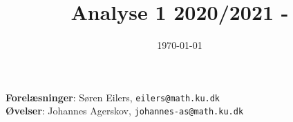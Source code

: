 \documentclass{article}
\title{Analyse 1 2020/2021 -}
\author{}
\date{\vspace{-1cm}\today}
\begin{document}
\maketitle

\noindent
\textbf{Forelæsninger}: S\o{}ren Eilers, \texttt{eilers@math.ku.dk} \\
\textbf{Øvelser}: Johannes Agerskov, \texttt{johannes-as@math.ku.dk}




%
%
%
%
%
%

%
%

%
\end{document}
